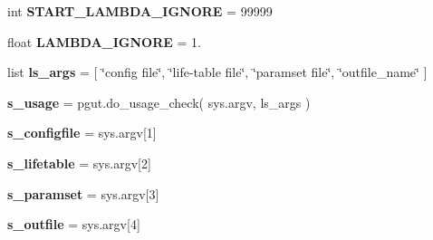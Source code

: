 \begin{DoxyCompactItemize}
\item 
int {\bfseries S\+T\+A\+R\+T\+\_\+\+L\+A\+M\+B\+D\+A\+\_\+\+I\+G\+N\+O\+RE} = 99999\hypertarget{namespacenegui_1_1pginputsimupop_aebdabae8935f1cc65cbe066536d419d1}{}\label{namespacenegui_1_1pginputsimupop_aebdabae8935f1cc65cbe066536d419d1}

\item 
float {\bfseries L\+A\+M\+B\+D\+A\+\_\+\+I\+G\+N\+O\+RE} = 1.\hypertarget{namespacenegui_1_1pginputsimupop_a96086e1c7bd6ecf9edefe0db49fc966e}{}\label{namespacenegui_1_1pginputsimupop_a96086e1c7bd6ecf9edefe0db49fc966e}

\item 
list {\bfseries ls\+\_\+args} = \mbox{[} \char`\"{}config file\char`\"{}, \char`\"{}life-\/table file\char`\"{}, \char`\"{}paramset file\char`\"{}, \char`\"{}outfile\+\_\+name\char`\"{} \mbox{]}\hypertarget{namespacenegui_1_1pginputsimupop_a212871332a72d3f19da8448e4ca04a35}{}\label{namespacenegui_1_1pginputsimupop_a212871332a72d3f19da8448e4ca04a35}

\item 
{\bfseries s\+\_\+usage} = pgut.\+do\+\_\+usage\+\_\+check( sys.\+argv, ls\+\_\+args )\hypertarget{namespacenegui_1_1pginputsimupop_a4d7b2ce5d00d1602247ff5f3e204d434}{}\label{namespacenegui_1_1pginputsimupop_a4d7b2ce5d00d1602247ff5f3e204d434}

\item 
{\bfseries s\+\_\+configfile} = sys.\+argv\mbox{[}1\mbox{]}\hypertarget{namespacenegui_1_1pginputsimupop_af369b347e55b2a28d8cfcdec5f7cf37e}{}\label{namespacenegui_1_1pginputsimupop_af369b347e55b2a28d8cfcdec5f7cf37e}

\item 
{\bfseries s\+\_\+lifetable} = sys.\+argv\mbox{[}2\mbox{]}\hypertarget{namespacenegui_1_1pginputsimupop_a1c6ba95bf6bdd72ae956dd939192c5a3}{}\label{namespacenegui_1_1pginputsimupop_a1c6ba95bf6bdd72ae956dd939192c5a3}

\item 
{\bfseries s\+\_\+paramset} = sys.\+argv\mbox{[}3\mbox{]}\hypertarget{namespacenegui_1_1pginputsimupop_a5a79f3003860699f2ac660ae78b9efe5}{}\label{namespacenegui_1_1pginputsimupop_a5a79f3003860699f2ac660ae78b9efe5}

\item 
{\bfseries s\+\_\+outfile} = sys.\+argv\mbox{[}4\mbox{]}\hypertarget{namespacenegui_1_1pginputsimupop_a43dc89670d5ffaa1cfb5f3af3a910114}{}\label{namespacenegui_1_1pginputsimupop_a43dc89670d5ffaa1cfb5f3af3a910114}


\end{DoxyCompactItemize}
